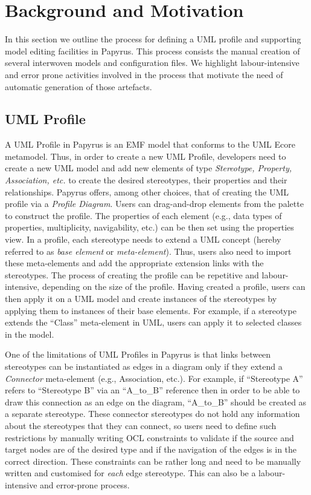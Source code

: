 \section{Background and Motivation}
\label{sec:background}

In this section we outline the process for defining a UML profile and supporting model editing facilities in Papyrus. This process consists the manual creation of several interwoven models and configuration files. We highlight labour-intensive and error prone activities involved in the process that motivate the need of automatic generation of those artefacts.

\subsection{UML Profile}
A UML Profile in Papyrus is an EMF model that conforms to the UML Ecore 
metamodel. Thus, in order to create a new UML Profile, developers need to 
create a new UML model and add new elements of type \textit{Stereotype, 
Property, Association, etc.} to create the desired stereotypes, their 
properties and their relationships. Papyrus offers, among other choices, that 
of creating the UML profile via a \textit{Profile Diagram}. Users can 
drag-and-drop elements from the palette to 
construct the profile. The properties of each element (e.g., data types of 
properties, multiplicity, navigability, etc.) can be then set using the 
properties view. In a profile, each stereotype needs to 
extend a UML concept (hereby referred to as \textit{base element} or \textit{meta-element}). Thus, users also need to import these meta-elements and add the 
appropriate extension links with the stereotypes. The process of creating the 
profile can be repetitive and labour-intensive, depending on the size of the 
profile.  
Having created a profile, users can then apply it on a UML model and 
create instances of the stereotypes by applying them to instances of their base 
elements. For example, if a stereotype extends the ``Class'' meta-element in 
UML, users can apply it to selected classes in the model. 

One of the limitations of UML Profiles in Papyrus is that links between 
stereotypes can be instantiated as edges in a diagram only if they  extend a 
\textit{Connector} meta-element (e.g., Association, etc.).  For 
example, if ``Stereotype A'' refers to ``Stereotype B'' via an ``A\_to\_B'' 
reference then in order to be able to draw this connection as an edge on 
the diagram, ``A\_to\_B'' should be created as a separate stereotype. These 
connector stereotypes do not hold any information about the stereotypes that 
they can connect, so users need to define such restrictions by manually writing 
OCL constraints to validate if the source and target nodes are of the desired 
type and if the navigation of the edges is in the correct direction. These 
constraints can be rather long and need to be manually written and customised 
for \textit{each} edge stereotype. This can also be a labour-intensive and 
error-prone process.

